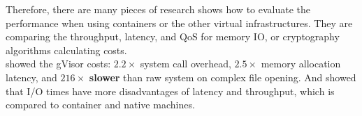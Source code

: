 Therefore, there are many pieces of research shows how to evaluate the performance when
using containers or the other virtual infrastructures\cite{7371699,KOZHIRBAYEV2017175,7095802,234857}.
They are comparing the throughput, latency, and QoS for memory IO, or cryptography
algorithms calculating costs.\\

\textcite{234857} showed the gVisor costs: $2.2\times$ system call overhead,
$2.5\times$ memory allocation latency, and $216\times$ \textbf{slower} than raw system on
complex file opening. And \textcite{KOZHIRBAYEV2017175} showed that I/O times have more
disadvantages of latency and throughput, which is compared to container and native machines.
